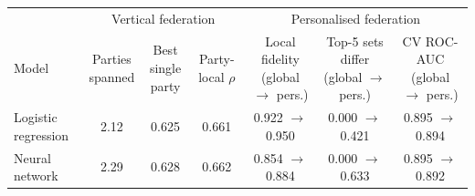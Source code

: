 \begin{tabular}{lcccccc}
\toprule
 & \multicolumn{3}{c}{Vertical federation} & \multicolumn{3}{c}{Personalised federation} \\
\cmidrule(lr){2-4}\cmidrule(lr){5-7}
Model & \makecell{Parties\\spanned} & \makecell{Best single\\party} & \makecell{Party-local\\$\rho$} & \makecell{Local fidelity\\(global $\to$ pers.)} & \makecell{Top-5 sets differ\\(global $\to$ pers.)} & \makecell{CV ROC-AUC\\(global $\to$ pers.)} \\
\midrule
Logistic regression & 2.12 & 0.625 & 0.661 & 0.922 $\to$ 0.950 & 0.000 $\to$ 0.421 & 0.895 $\to$ 0.894 \\
Neural network & 2.29 & 0.628 & 0.662 & 0.854 $\to$ 0.884 & 0.000 $\to$ 0.633 & 0.895 $\to$ 0.892 \\
\bottomrule
\end{tabular}
